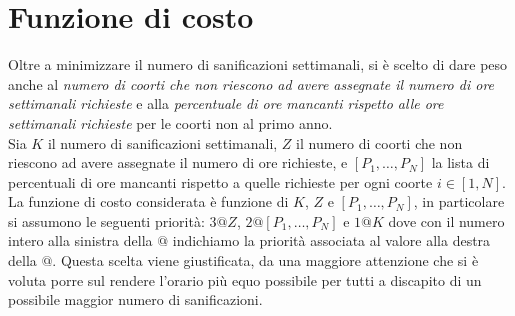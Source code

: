 \documentclass[12pt, italian, openany]{book}
\begin{document}
\section{Funzione di costo}\label{costo}
Oltre a minimizzare il numero di sanificazioni settimanali, si è scelto di dare peso anche al \textit{numero di coorti che non riescono ad avere assegnate il numero di ore settimanali richieste} e alla \textit{percentuale di ore mancanti rispetto alle ore settimanali richieste} per le coorti non al primo anno.\\
Sia $K$ il numero di sanificazioni settimanali, $Z$ il numero di coorti che non riescono ad avere assegnate il numero di ore richieste, e $\left[P_1, \dots, P_N \right]$ la lista di percentuali di ore mancanti rispetto a quelle richieste per ogni coorte $i \in \left[1, N \right]$.\\
La funzione di costo considerata è funzione di $K$, $Z$ e $\left[P_1, \dots, P_N \right]$, in particolare si assumono le seguenti priorità: $3@Z$, $2@\left[P_1, \dots, P_N \right]$ e $1@K$ dove con il numero intero alla sinistra della $@$ indichiamo la priorità associata al valore alla destra della $@$.
Questa scelta viene giustificata, da una maggiore attenzione che si è voluta porre sul rendere l'orario più equo possibile per tutti a discapito di un possibile maggior numero di sanificazioni.
\end{document}
